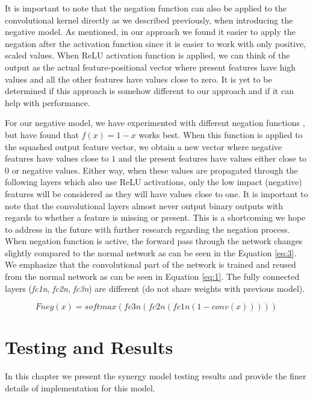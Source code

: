 \documentclass[b5paper]{book}
\let\cite\parencite
\begin{document}
It is important to note that the negation function can also be applied to the convolutional kernel directly as we described previously, when introducing the negative model. As mentioned, in our approach we found it easier to apply the negation after the activation function since it is easier to work with only positive, scaled values. When ReLU activation function is applied, we can think of the output as the actual feature-positional vector where present features have high values and all the other features have values close to zero. It is yet to be determined if this approach is somehow different to our approach and if it can help with performance.

For our negative model, we have experimented with different negation functions \cite{milovsevic2019classification}, but have found that \( f(x) = 1 - x \) works best. When this function is applied to the squashed output feature vector, we obtain a new vector where negative features have values close to \(1\) and the present features have values either close to \(0\) or negative values. Either way, when these values are propagated through the following layers which also use ReLU activations, only the low impact (negative) features will be considered as they will have values close to one. It is important to note that the convolutional layers almost never output binary outputs with regards to whether a feature is missing or present. This is a shortcoming we hope to address in the future with further research regarding the negation process. When negation function is active, the forward pass through the network changes slightly compared to the normal network as can be seen in the Equation \ref{eq:3}. We emphasize that the convolutional part of the network is trained and reused from the normal network as can be seen in Equation \ref{eq:1}. The fully connected layers (\emph{fc1n}, \emph{fc2n}, \emph{fc3n}) are different (do not share weights with previous model).

\begin{equation}\label{eq:3}
Fneg(x) = softmax(fc3n(fc2n(fc1n(1 - conv(x)))))
\end{equation}

\chapter{Testing and Results}

In this chapter we present the synergy model testing results and provide the finer details of implementation for this model.
\end{document}
